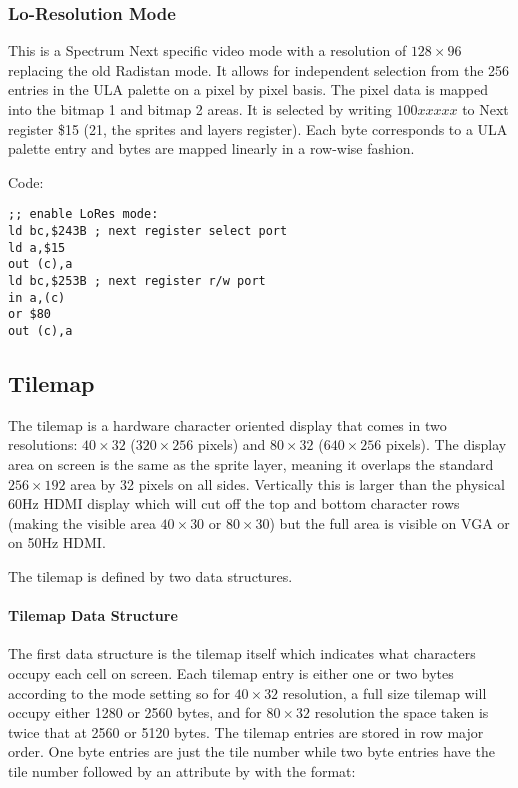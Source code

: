 \subsubsection{Lo-Resolution Mode}

This is a Spectrum Next specific video mode with a resolution of
$128\times96$ replacing the old Radistan mode.  It allows for
independent selection from the 256 entries in the ULA palette on a
pixel by pixel basis. The pixel data is mapped into the bitmap 1 and
bitmap 2 areas.  It is selected by writing $100xxxxx$ to Next register
\$15 (21, the sprites and layers register).  Each byte corresponds to
a ULA palette entry and bytes are mapped linearly in a row-wise
fashion.

Code:
\begin{verbatim}
;; enable LoRes mode:
ld bc,$243B ; next register select port
ld a,$15
out (c),a
ld bc,$253B ; next register r/w port
in a,(c)
or $80
out (c),a
\end{verbatim}

\subsection{Tilemap}

The tilemap is a hardware character oriented display that comes in two
resolutions: $40\times32$ ($320\times256$ pixels) and $80\times32$
($640\times256$ pixels).  The display area on screen is the same as
the sprite layer, meaning it overlaps the standard $256\times192$ area
by 32 pixels on all sides.  Vertically this is larger than the
physical 60Hz HDMI display which will cut off the top and bottom
character rows (making the visible area $40\times30$ or $80\times30$)
but the full area is visible on VGA or on 50Hz HDMI.

The tilemap is defined by two data structures.

\paragraph{Tilemap Data Structure}

The first data structure is the tilemap itself which indicates what
characters occupy each cell on screen.  Each tilemap entry is either
one or two bytes according to the mode setting so for $40\times32$
resolution, a full size tilemap will occupy either 1280 or 2560 bytes,
and for $80\times32$ resolution the space taken is twice that at 2560
or 5120 bytes.  The tilemap entries are stored in row major order. One
byte entries are just the tile number while two byte entries have the
tile number followed by an attribute by with the format:

